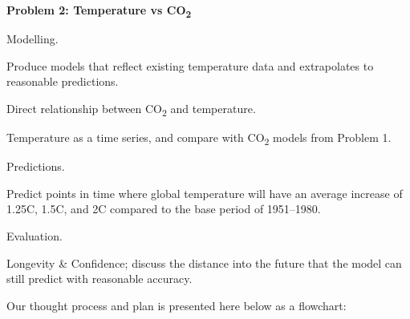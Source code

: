 \documentclass{mcmthesis}
\begin{document}
    \noindent\textbf{Problem 2: Temperature vs CO\textsubscript{2}}

    \begin{adjustwidth}{1cm}{}

        \noindent Modelling.

        \vspace{-6pt}
        \noindent Produce models that reflect existing temperature data and extrapolates to reasonable predictions.

        \begin{adjustwidth}{1cm}{}
            \noindent Direct relationship between CO\textsubscript{2} and temperature.

            \noindent Temperature as a time series, and compare with CO\textsubscript{2} models from Problem 1.
        \end{adjustwidth}

        \noindent Predictions.

        \vspace{-6pt}
        \noindent Predict points in time where global temperature will have an average increase of 1.25\textdegree C, 1.5\textdegree C, and 2\textdegree C compared to the base period of 1951--1980.

        \noindent Evaluation.

        \vspace{-6pt}
        \noindent Longevity \& Confidence; discuss the distance into the future that the model can still predict with reasonable accuracy.


    \end{adjustwidth}

    \bigskip

    \noindent Our thought process and plan is presented here below as a flowchart:
    \begin{center}
    \end{center}
\end{document}
